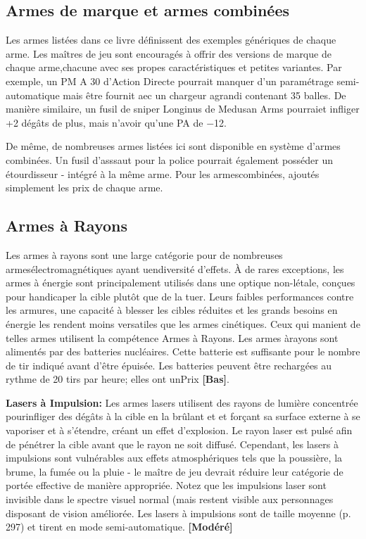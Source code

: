 \subsection{Armes de marque et armes combinées} \label{sec:brand-weapons-combined} 

Les armes listées dans ce livre définissent des exemples génériques de chaque arme. Les maîtres de jeu sont encouragés à offrir des versions de marque de chaque arme,chacune avec ses propes caractéristiques et petites variantes. Par exemple, un PM A 30 d'Action Directe pourrait manquer d'un paramétrage semi-automatique mais être fournit aec un chargeur agrandi contenant 35 balles. De manière similaire, un fusil de sniper Longinus de Medusan Arms pourraiet infliger +2 dégâts de plus, mais n'avoir qu'une PA de $-$12. 

De même, de nombreuses armes listées ici sont disponible en système d'armes combinées. Un fusil d'asssaut pour la police pourrait également posséder un étourdisseur - intégré à la même arme. Pour les armescombinées, ajoutés simplement les prix de chaque arme. 



\subsection{Armes à Rayons} \label{sec:beam-weapons} 

Les armes à rayons sont une large catégorie pour de nombreuses armesélectromagnétiques ayant uendiversité d'effets. À de rares exceptions, les armes à énergie sont principalement utilisés dans une optique non-létale, conçues pour handicaper la cible plutôt que de la tuer. Leurs faibles performances contre les armures, une capacité à blesser les cibles réduites et les grands besoins en énergie les rendent moins versatiles que les armes cinétiques. Ceux qui manient de telles armes utilisent la compétence Armes à Rayons. Les armes àrayons sont alimentés par des batteries nucléaires. Cette batterie est suffisante pour le nombre de tir indiqué avant d'être épuisée. Les batteries peuvent être rechargées au rythme de 20 tirs par heure; elles ont unPrix \textbf{[Bas]}. 

\textbf{Lasers à Impulsion:} Les armes lasers utilisent des rayons de lumière concentrée pourinfliger des dégâts à la cible en la brûlant et et forçant sa surface externe à se vaporiser et à s'étendre, créant un effet d'explosion. Le rayon laser est pulsé afin de pénétrer la cible avant que le rayon ne soit diffusé. Cependant, les lasers à impulsions sont vulnérables aux effets atmosphériques tels que la poussière, la brume, la fumée ou la pluie - le maître de jeu devrait réduire leur catégorie de portée effective de manière appropriée. Notez que les impulsions laser sont invisible dans le spectre visuel normal (mais restent visible aux personnages disposant de vision améliorée. Les lasers à impulsions sont de taille moyenne (p. 297) et tirent en mode semi-automatique. \textbf{[Modéré]} 

